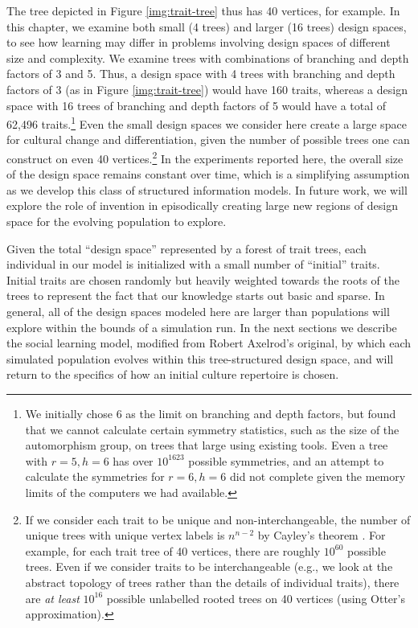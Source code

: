 The tree depicted in Figure \ref{img:trait-tree} thus has 40 vertices,
for example. In this chapter, we examine both small (4 trees) and larger
(16 trees) design spaces, to see how learning may differ in problems
involving design spaces of different size and complexity. We examine
trees with combinations of branching and depth factors of 3 and 5. Thus,
a design space with 4 trees with branching and depth factors of 3 (as in
Figure \ref{img:trait-tree}) would have 160 traits, whereas a design
space with 16 trees of branching and depth factors of 5 would have a
total of 62,496 traits.\footnote{We initially chose 6 as the limit on
  branching and depth factors, but found that we cannot calculate
  certain symmetry statistics, such as the size of the automorphism
  group, on trees that large using existing tools. Even a tree with
  $r=5, h=6$ has over $10^{1623}$ possible symmetries, and an attempt to
  calculate the symmetries for $r=6, h=6$ did not complete given the
  memory limits of the computers we had available.} Even the small
design spaces we consider here create a large space for cultural change
and differentiation, given the number of possible trees one can
construct on even 40 vertices.\footnote{If we consider each trait to be
  unique and non-interchangeable, the number of unique trees with unique
  vertex labels is $n^{n-2}$ by Cayley's theorem
  \citep{diestel2010graph}. For example, for each trait tree of 40
  vertices, there are roughly $10^{60}$ possible trees. Even if we
  consider traits to be interchangeable (e.g., we look at the abstract
  topology of trees rather than the details of individual traits), there
  are \emph{at least} $10^{16}$ possible unlabelled rooted trees on 40
  vertices (using Otter's \citeyearpar{otter1948number} approximation).}
In the experiments reported here, the overall size of the design space
remains constant over time, which is a simplifying assumption as we
develop this class of structured information models. In future work, we
will explore the role of invention in episodically creating large new
regions of design space for the evolving population to explore.

Given the total ``design space'' represented by a forest of trait trees,
each individual in our model is initialized with a small number of
``initial'' traits. Initial traits are chosen randomly but heavily
weighted towards the roots of the trees to represent the fact that our
knowledge starts out basic and sparse. In general, all of the design
spaces modeled here are larger than populations will explore within the
bounds of a simulation run. In the next sections we describe the social
learning model, modified from Robert Axelrod's original, by which each
simulated population evolves within this tree-structured design space,
and will return to the specifics of how an initial culture repertoire is
chosen.

